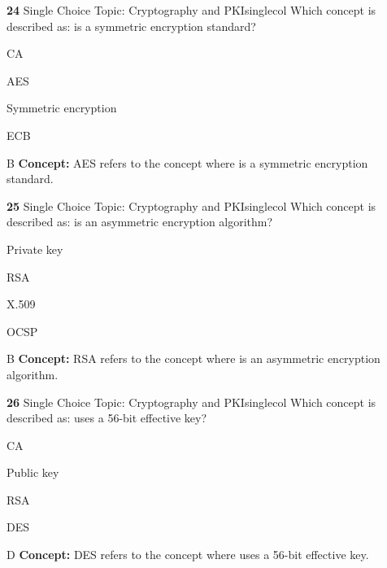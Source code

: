 \documentclass[10pt,a4paper]{article}
\begin{document}
\begin{qcard}{\color{white}\textbf{24} \hfill \small Single Choice \textbar{} Topic: Cryptography and PKI}{singlecol}
Which concept is described as: is a symmetric encryption standard?

\begin{qoptions}
\item CA
\item AES
\item Symmetric encryption
\item ECB
\end{qoptions}
\begin{explainbox}{B}
\textbf{Concept:} AES refers to the concept where is a symmetric encryption standard.
\end{explainbox}
\end{qcard}

\begin{qcard}{\color{white}\textbf{25} \hfill \small Single Choice \textbar{} Topic: Cryptography and PKI}{singlecol}
Which concept is described as: is an asymmetric encryption algorithm?

\begin{qoptions}
\item Private key
\item RSA
\item X.509
\item OCSP
\end{qoptions}
\begin{explainbox}{B}
\textbf{Concept:} RSA refers to the concept where is an asymmetric encryption algorithm.
\end{explainbox}
\end{qcard}

\begin{qcard}{\color{white}\textbf{26} \hfill \small Single Choice \textbar{} Topic: Cryptography and PKI}{singlecol}
Which concept is described as: uses a 56-bit effective key?

\begin{qoptions}
\item CA
\item Public key
\item RSA
\item DES
\end{qoptions}
\begin{explainbox}{D}
\textbf{Concept:} DES refers to the concept where uses a 56-bit effective key.
\end{explainbox}
\end{qcard}
\end{document}
